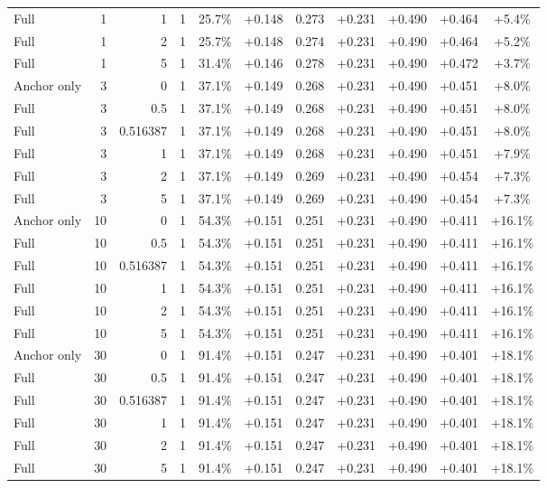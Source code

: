 \begin{table}[htbp]
\begin{tabular}{lrrrccccccc}
Full & 1 & 1 & 1 & 25.7\% & +0.148 & 0.273 & +0.231 & +0.490 & +0.464 & +5.4\% \\
Full & 1 & 2 & 1 & 25.7\% & +0.148 & 0.274 & +0.231 & +0.490 & +0.464 & +5.2\% \\
Full & 1 & 5 & 1 & 31.4\% & +0.146 & 0.278 & +0.231 & +0.490 & +0.472 & +3.7\% \\
Anchor only & 3 & 0 & 1 & 37.1\% & +0.149 & 0.268 & +0.231 & +0.490 & +0.451 & +8.0\% \\
Full & 3 & 0.5 & 1 & 37.1\% & +0.149 & 0.268 & +0.231 & +0.490 & +0.451 & +8.0\% \\
Full & 3 & 0.516387 & 1 & 37.1\% & +0.149 & 0.268 & +0.231 & +0.490 & +0.451 & +8.0\% \\
Full & 3 & 1 & 1 & 37.1\% & +0.149 & 0.268 & +0.231 & +0.490 & +0.451 & +7.9\% \\
Full & 3 & 2 & 1 & 37.1\% & +0.149 & 0.269 & +0.231 & +0.490 & +0.454 & +7.3\% \\
Full & 3 & 5 & 1 & 37.1\% & +0.149 & 0.269 & +0.231 & +0.490 & +0.454 & +7.3\% \\
Anchor only & 10 & 0 & 1 & 54.3\% & +0.151 & 0.251 & +0.231 & +0.490 & +0.411 & +16.1\% \\
Full & 10 & 0.5 & 1 & 54.3\% & +0.151 & 0.251 & +0.231 & +0.490 & +0.411 & +16.1\% \\
Full & 10 & 0.516387 & 1 & 54.3\% & +0.151 & 0.251 & +0.231 & +0.490 & +0.411 & +16.1\% \\
Full & 10 & 1 & 1 & 54.3\% & +0.151 & 0.251 & +0.231 & +0.490 & +0.411 & +16.1\% \\
Full & 10 & 2 & 1 & 54.3\% & +0.151 & 0.251 & +0.231 & +0.490 & +0.411 & +16.1\% \\
Full & 10 & 5 & 1 & 54.3\% & +0.151 & 0.251 & +0.231 & +0.490 & +0.411 & +16.1\% \\
Anchor only & 30 & 0 & 1 & 91.4\% & +0.151 & 0.247 & +0.231 & +0.490 & +0.401 & +18.1\% \\
Full & 30 & 0.5 & 1 & 91.4\% & +0.151 & 0.247 & +0.231 & +0.490 & +0.401 & +18.1\% \\
Full & 30 & 0.516387 & 1 & 91.4\% & +0.151 & 0.247 & +0.231 & +0.490 & +0.401 & +18.1\% \\
Full & 30 & 1 & 1 & 91.4\% & +0.151 & 0.247 & +0.231 & +0.490 & +0.401 & +18.1\% \\
Full & 30 & 2 & 1 & 91.4\% & +0.151 & 0.247 & +0.231 & +0.490 & +0.401 & +18.1\% \\
Full & 30 & 5 & 1 & 91.4\% & +0.151 & 0.247 & +0.231 & +0.490 & +0.401 & +18.1\% \\

\end{tabular}
\end{table}
